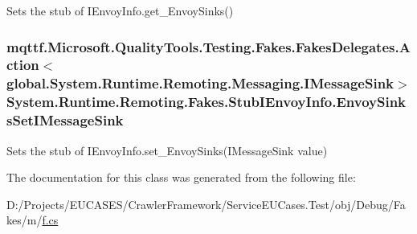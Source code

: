 Sets the stub of I\-Envoy\-Info.\-get\-\_\-\-Envoy\-Sinks()

\hypertarget{class_system_1_1_runtime_1_1_remoting_1_1_fakes_1_1_stub_i_envoy_info_abb2792bf7806a757f3ee2ac71ad05247}{
\subsubsection[{Envoy\-Sinks\-Set\-I\-Message\-Sink}]{\setlength{\rightskip}{0pt plus 5cm}mqttf.\-Microsoft.\-Quality\-Tools.\-Testing.\-Fakes.\-Fakes\-Delegates.\-Action$<$global.\-System.\-Runtime.\-Remoting.\-Messaging.\-I\-Message\-Sink$>$ System.\-Runtime.\-Remoting.\-Fakes.\-Stub\-I\-Envoy\-Info.\-Envoy\-Sinks\-Set\-I\-Message\-Sink}}\label{class_system_1_1_runtime_1_1_remoting_1_1_fakes_1_1_stub_i_envoy_info_abb2792bf7806a757f3ee2ac71ad05247}


Sets the stub of I\-Envoy\-Info.\-set\-\_\-\-Envoy\-Sinks(\-I\-Message\-Sink value)



The documentation for this class was generated from the following file\-:\begin{DoxyCompactItemize}
\item 
D\-:/\-Projects/\-E\-U\-C\-A\-S\-E\-S/\-Crawler\-Framework/\-Service\-E\-U\-Cases.\-Test/obj/\-Debug/\-Fakes/m/\hyperlink{m_2f_8cs}{f.\-cs}\end{DoxyCompactItemize}
